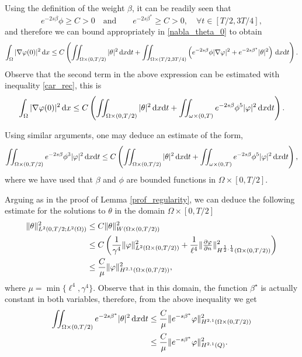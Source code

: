 \documentclass[preprint,10pt]{article}
\numberwithin{equation}{section}
\numberwithin{theorem}{section}
\def\dx{\,\textnormal{d}x}
\def\dt{\textnormal{d}t}
\def\dx{\,\textnormal{d}x}
\def\dt{\textnormal{d}t}
\begin{document}
{Using the definition of the weight $\beta$, it can be readily seen that
%
\begin{equation*}
e^{-2s\beta}\phi\geq C >0 \quad\text{and}\quad \quad  e^{-2s\beta^*}\geq C>0, \quad \forall t\in[T/2,3T/4],
\end{equation*}
%
and therefore we can bound appropriately in \eqref{nabla_theta_0} to obtain
%
\begin{equation*}
\int_{\Omega}|\nabla\varphi(0)|^2\dx\leq C\left(\iint_{\Omega\times(0,T/2)}|\theta|^2\dx\dt+\iint_{\Omega\times(T/2,3T/4)}\left(e^{-2s\beta}\phi|\nabla\varphi|^2+e^{-2s\beta^\star}|\theta|^2\right)\dx\dt\right).
\end{equation*}
%
Observe that the second term in the above expression can be estimated with inequality \eqref{car_rec}, this is
%
\begin{equation}\label{est_h01_theta}
\int_{\Omega}|\nabla\varphi(0)|^2\dx\leq C\left(\iint_{\Omega\times(0,T/2)}|\theta|^2\dx\dt+\iint_{\omega\times(0,T)}e^{-2s\beta}\phi^5|\varphi|^2\dx\dt\right).
\end{equation}

Using similar arguments, one may deduce an estimate of the form,
%
\begin{equation}\label{est_phi_0}
\iint_{\Omega\times(0,T/2)}e^{-2s\beta}\phi^3|\varphi|^2\dx\dt\leq C\left(\iint_{\Omega\times(0,T/2)}|\theta|^2\dx\dt+\iint_{\omega\times(0,T)}e^{-2s\beta}\phi^5|\varphi|^2\dx\dt\right),
\end{equation}
%
where we have used that $\beta$ and $\phi$ are bounded functions in $\Omega\times[0,T/2]$.

Arguing as in the proof of Lemma \ref{prof_regularity}, we can deduce the following estimate for the solutions to $\theta$ in the domain $\Omega\times [0,T/2]$
%
\begin{align}\notag 
\|\theta\|^2_{L^2(0,T/2;L^2(\Omega))}&\leq C\|\theta\|^2_{W(\Omega\times(0,T/2))}\\ \notag
&\leq C\left(\frac{1}{\gamma^4}\|\varphi\|^2_{L^2(\Omega\times(0,T/2))}+\frac{1}{\ell^4}\|\tfrac{\partial \varphi}{\partial n}\|^2_{H^{\frac12,\frac14}(\Omega\times(0,T/2))}\right) \\ \label{est_theta}
&\leq \frac{C}{\mu}\|\varphi\|_{H^{2,1}(\Omega\times(0,T/2))}^2,
\end{align}
%
where $\mu=\min\{\ell^4,\gamma^4\}$. Observe that in this domain, the function $\beta^\star$ is actually constant in both variables, therefore, from the above inequality we get
%
\begin{align}\notag
\iint_{\Omega\times(0,T/2)}e^{-2s\beta^*}|\theta|^2\dx\dt &\leq \frac{C}{\mu}\|e^{-s\beta^*}\varphi\|_{H^{2,1}(\Omega\times(0,T/2))}^2 \\ \label{est_theta_tme}
&\leq \frac{C}{\mu}\|e^{-s\beta^*}\varphi\|_{H^{2,1}(Q)}^2.
\end{align}
%

}
\end{document}
